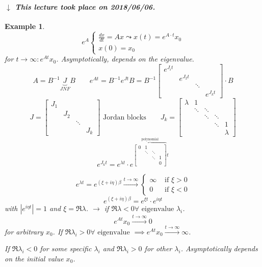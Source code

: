 \documentclass[a4paper]{article}
\newcounter{lecref}[section]
\numberwithin{lecref}{section}
\newtheorem{example}[lecref]{Example}
\newcommand{\card}[1]{\left|#1\right|}
\newcommand{\dateref}[1]{%
  \begin{mdframed}[backgroundcolor=gray!10,innerbottommargin=0pt,innertopmargin=0pt]
    \paragraph{\textit{$\downarrow$ This lecture took place on #1.}}%
  \end{mdframed}%
}
\begin{document}
\dateref{2018/06/06}

\begin{example} %
  \[ e^A \begin{cases} \frac{dx}{dt} = Ax \leadsto x(t) = e^{A \cdot t} x_0 \\ x(0) = x_0 \end{cases} \]
  for $t \to \infty: e^{At} x_0$.
  Asymptotically, depends on the eigenvalue.
  \[ A = B^{-1} \underbrace{J}_{JNF} B \qquad e^{At} = B^{-1} e^{Jt} B = B^{-1} \begin{bmatrix} e^{J_it} & & & \\ & e^{J_2 t} & & \\ & & \ddots & \\ & & & e^{J_k t} \end{bmatrix} \cdot B \]
  \[ J = \begin{bmatrix} J_1 & & & \\ & J_2 & & \\ & & \ddots & \\ & & & J_k \end{bmatrix} \text{ Jordan blocks} \qquad
     J_k = \begin{bmatrix} \lambda & 1 & & & \\ & \ddots & \ddots & & \\ & & \ddots & \ddots & \\ & & & \ddots & 1 \\ & & & & \lambda \end{bmatrix} \]
  \[ e^{J_k t} = e^{\lambda t} \cdot e^{\overbrace{\begin{bmatrix} 0 & 1 & & \\ & \ddots & \ddots & \\ & & \ddots & 1 \\ & & & 0 \end{bmatrix}}^{\text{polynomial}} t} \]

  \[ e^{\lambda t} = e^{(\xi + i \eta) \beta} \xrightarrow{t \to \infty} \begin{cases} \infty & \text{ if } \xi > 0 \\ 0 & \text{ if } \xi < 0 \end{cases} \]
  \[ e^{(\xi + i \eta) \beta} = e^{\xi t} \cdot e^{i \eta t} \]
  with $\card{e^{i \eta t}} = 1$ and $\xi = \Re{\lambda}$.
  $\to$ if $\Re{\lambda} < 0 \forall \text{ eigenvalue } \lambda_i$.
  \[ e^{At} x_0 \xrightarrow{t \to \infty} 0 \]
  for arbitrary $x_0$.
  If $\Re{\lambda_i} > 0 \forall \text{ eigenvalue}$ $\implies e^{At} x_0 \xrightarrow{t \to \infty} \infty$.

  If $\Re{\lambda_i} < 0$ for some specific $\lambda_i$ and $\Re{\lambda_i} > 0$ for other $\lambda_i$.
  Asymptotically depends on the initial value $x_0$.
\end{example}
\end{document}

